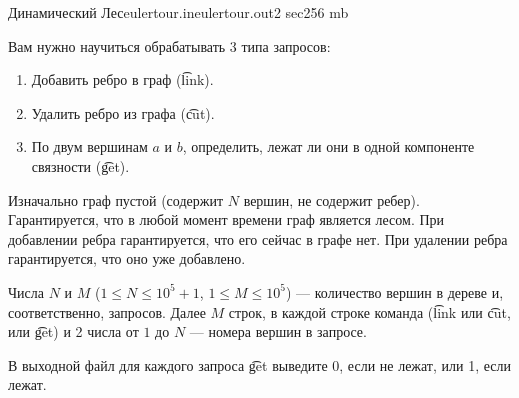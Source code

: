 \begin{problem}{Динамический Лес}{eulertour.in}{eulertour.out}{2 sec}{256 mb}

Вам нужно научиться обрабатывать 3 типа запросов:

\begin{enumerate}
  \item Добавить ребро в граф (\t{link}).
  \item Удалить ребро из графа (\t{cut}).
  \item По двум вершинам $a$ и $b$, определить, лежат ли они в одной компоненте связности (\t{get}).
\end{enumerate}

Изначально граф пустой (содержит $N$ вершин, не содержит ребер).
Гарантируется, что в любой момент времени граф является лесом. При добавлении ребра гарантируется,
что его сейчас в графе нет. При удалении ребра гарантируется, что оно уже добавлено.

\InputFile

Числа $N$ и $M$ ($1 \le N \le 10^5 + 1$, $1 \le M \le 10^5$) --- количество вершин в дереве и, соответственно, запросов.
Далее $M$ строк, в каждой строке команда (\t{link} или \t{cut}, или \t{get}) и 2 числа от $1$ до $N$ ---
номера вершин в запросе.

\OutputFile

В выходной файл для каждого запроса \t{get} выведите 0, если не лежат, или 1, если лежат.

\Example

\begin{example}
%
%
\end{example}

\end{problem}                           
